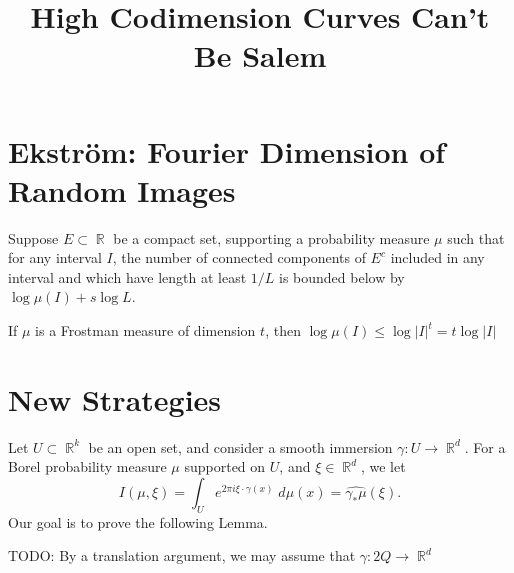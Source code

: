\documentclass[dvipsnames,letterpaper,12pt]{article}
\title{High Codimension Curves Can't Be Salem}
\DeclareMathOperator{\RR}{\mathbb{R}}
\begin{document}
\maketitle

\section{Ekstr\"{o}m: Fourier Dimension of Random Images}

Suppose $E \subset \RR$ be a compact set, supporting a probability measure $\mu$ such that for any interval $I$, the number of connected components of $E^c$ included in any interval and which have length at least $1/L$ is bounded below by $\log \mu(I) + s \log L$.

If $\mu$ is a Frostman measure of dimension $t$, then $\log \mu(I) \leq \log |I|^t = t \log |I|$

\section{New Strategies}

Let $U \subset \RR^k$ be an open set, and consider a smooth immersion $\gamma: U \to \RR^d$. For a Borel probability measure $\mu$ supported on $U$, and $\xi \in \RR^d$, we let
%
\[ I(\mu,\xi) = \int_U e^{2 \pi i \xi \cdot \gamma(x)}\; d\mu(x) = \widehat{\gamma_* \mu}(\xi). \]
%
Our goal is to prove the following Lemma.

TODO: By a translation argument, we may assume that $\gamma: 2Q \to \RR^d$
\end{document}
